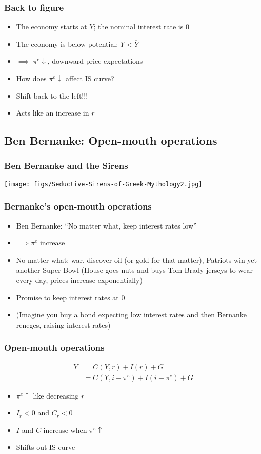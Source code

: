\documentclass[presentation,dvipsnames]{beamer}
\begin{document}
\begin{frame}
\frametitle{Back to figure}
\begin{itemize}[label={--}]
\item The economy starts at $Y$; the nominal interest rate is $0$
\item The economy is below potential: $Y < \overline{Y}$
\item $\implies$ $\pi^{e} \downarrow$, downward price expectations
\item How does $\pi^{e} \downarrow$ affect IS curve?
\item Shift back to the left!!!
\item Acts like an increase in $r$
\end{itemize}
\end{frame}

\subsection{Ben Bernanke: Open-mouth operations}


\begin{frame}
\frametitle{Ben Bernanke and the Sirens}
\centerline{\texttt{[image: figs/Seductive-Sirens-of-Greek-Mythology2.jpg]}}
\end{frame}

\begin{frame}
\frametitle{Bernanke's open-mouth operations}
\begin{itemize}[label={--}]
\item Ben Bernanke: ``No matter what, keep interest rates low''
\item $\implies \pi^{e}$ increase
\item No matter what: war,
discover oil (or gold for that matter),
Patriots win yet another Super Bowl (House goes nuts and buys Tom Brady jerseys to wear every day,
prices increase exponentially)
\item Promise to keep interest rates at 0
\item (Imagine you buy a bond expecting low interest rates and then Bernanke reneges, raising interest rates)
\end{itemize}
\end{frame}

\begin{frame}
\frametitle{Open-mouth operations}
\begin{align*}
Y &= C(Y,r) + I(r) + G \\
&= C(Y, i - \pi^{e}) + I(i-\pi^{e}) + G
\end{align*}
\begin{itemize}[label={--}]
\item $\pi^{e} \uparrow$ like decreasing $r$
\item $I_{r} < 0$ and $C_{r} < 0$
\item $I$ and $C$ increase when $\pi^{e} \uparrow$
\item Shifts out IS curve
\end{itemize}
\end{frame}
\end{document}
